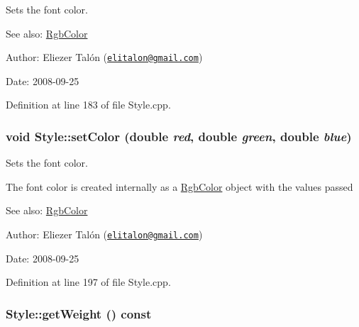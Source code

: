 Sets the font color. 

\begin{Desc}
\item[See also:]\hyperlink{struct_rgb_color}{RgbColor}\end{Desc}
\begin{Desc}
\item[Author:]Eliezer Talón (\href{mailto:elitalon@gmail.com}{\tt elitalon@gmail.com}) \end{Desc}
\begin{Desc}
\item[Date:]2008-09-25 \end{Desc}


Definition at line 183 of file Style.cpp.\hypertarget{class_style_8162fb5c89458b1892f1802231a63a16}{
\subsubsection[setColor]{\setlength{\rightskip}{0pt plus 5cm}void Style::setColor (double {\em red}, \/  double {\em green}, \/  double {\em blue})}}
\label{class_style_8162fb5c89458b1892f1802231a63a16}


Sets the font color. 

The font color is created internally as a \hyperlink{struct_rgb_color}{RgbColor} object with the values passed

\begin{Desc}
\item[See also:]\hyperlink{struct_rgb_color}{RgbColor}\end{Desc}
\begin{Desc}
\item[Author:]Eliezer Talón (\href{mailto:elitalon@gmail.com}{\tt elitalon@gmail.com}) \end{Desc}
\begin{Desc}
\item[Date:]2008-09-25 \end{Desc}


Definition at line 197 of file Style.cpp.\hypertarget{class_style_5798e7a57bb2df5e37aa0cdc5606a8b3}{
\subsubsection[getWeight]{ Style::getWeight () const}}
\label{class_style_5798e7a57bb2df5e37aa0cdc5606a8b3}



